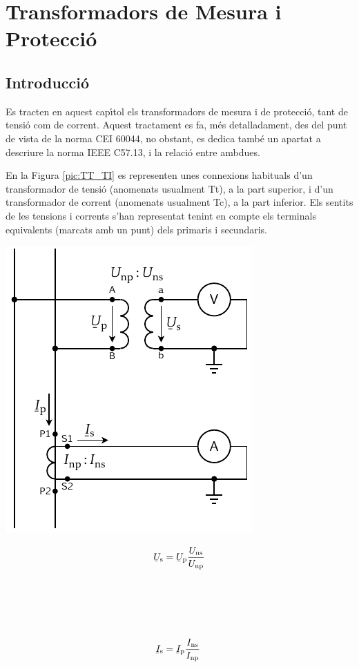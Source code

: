 \chapter{Transformadors de Mesura i Protecci\'{o}}\label{sec:tr_mes_prot}


\section{Introducci\'{o}}
Es tracten en aquest cap\'{\i}tol els transformadors de
mesura i de protecci\'{o}, tant de tensi\'{o} com de corrent. Aquest
tractament es fa, m\'{e}s detalladament, des del punt de vista de la norma \textsf{CEI 60044}, no obstant, es dedica tamb\'{e} un
apartat a descriure la norma  \textsf{IEEE C57.13}, i la
relaci\'{o} entre ambdues.

En la Figura \vref{pic:TT_TI} es representen unes connexions
habituals d'un transformador de tensi\'{o} (anomenats usualment Tt), a
la part superior, i d'un transformador de corrent (anomenats
usualment Tc), a la part inferior. Els sentits de les tensions
i corrents s'han representat tenint en compte els terminals
equivalents (marcats amb un punt) dels primaris i secundaris.

\hfill
\begin{minipage}[b]{90mm}
    \hspace{1.5cm}
    \includegraphics{Imatges/Cap-TrafosMesProt-TI-TT.pdf}
    \label{pic:TT_TI}
\end{minipage}
\hfill
\begin{minipage}[b][70mm][t]{50mm}
   \begin{align}
      \cmplx{U}\ped{s} &= \cmplx{U}\ped{p} \frac{U\ped{ns}}{U\ped{np}}
      \\[24mm]
      \cmplx{I}\ped{s} &= \cmplx{I}\ped{p} \frac{I\ped{ns}}{I\ped{np}}
   \end{align}
\end{minipage}

